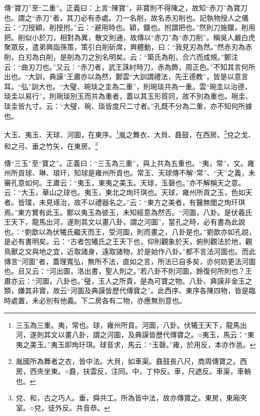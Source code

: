 {\noindent\zhuan{}\fzbyks 傳“寶刀”至“二重”。正義曰：上言“陳寶”，非寶則不得陳之，故知“赤刀”為寶刀也。謂之“赤刀”者，其刀必有赤處。刀一名削，故名赤刃削也。記執物授人之儀云：“刀授穎，削授拊。”云：“避用時也。穎，鐶也。拊謂把也。”然則刀施鐶，削用把。削似小於刀，相對為異，散文則通，故傳以“赤刀”為“赤刀削”。稱吳人嚴白虎聚眾反，遣弟興詣孫策，策引白削斫席，興體動，曰：“我見刃為然。”然赤刃為赤削，白刃為白削，是削為刀之別名明矣。云：“築氏為削，合六而成規。”鄭注云：“曲刃刀也。”又云：“赤刀者，武王誅紂時刀，赤為飾，周正色。”不知其言何所出也。“大訓，典謨”王肅亦以為然，鄭雲“大訓謂禮法，先王德教”，皆是以意言耳。“弘”訓大也。“大璧、琬琰之圭為二重”，則琬琰共為一重。雲“琬圭以治德，琰圭以易行”，則琬琰別玉而共為重者，蓋以其玉形質同，故不別為重也。琬圭、琰圭皆九寸。云：“大璧、琬、琰皆度尺二寸者。”孔既不分為二重，亦不知何所據也。 \par}

大玉、夷玉、天球、河圖，在東序。\footnote{三玉為三重。夷，常也。球，雍州所貢。河圖，八卦。伏犧王天下，龍馬出河，遂則其文以畫八卦，謂之河圖，及典謨皆歷代傳寶之。○夷玉，馬云：“東夷之美玉。”夷玉即珣玗琪。球音求，馬云：“玉磬。”雍，於用反，本亦作邕。}胤之舞衣、大貝、鼖鼓，在西房。\footnote{胤國所為舞者之衣，皆中法。大貝，如車渠。鼖鼓長八尺，商周傳寶之。西房，西夾坐東。○鼖，扶雲反，注同。中，丁仲反。車，尺遮反。車渠，車輈也。}兌之戈、和之弓、垂之竹矢，在東房。\footnote{兌、和，古之巧人。垂，舜共工。所為皆中法，故亦傳寶之。東房，東廂夾室。○兌，徒外反。共音恭。}


{\noindent\zhuan{}\fzbyks 傳“三玉”至“寶之”。正義曰：“三玉為三重”，與上共為五重也。“夷，常”，文。雍州所貢球、琳、琅玕，知球是雍州所貢也。常玉、天球傳不解“常”、“天”之義，未審孔意如何。王肅云：“夷玉，東夷之美玉。天球，玉磬也。”亦不解稱天之意。云：“大玉，華山之球也。夷玉，東北之珣玕琪也。天球，雍州所貢之玉，色如天者。皆璞，未見琢治，故不以禮器名之。”云：“東方之美者，有醫無閭之珣玕琪焉。”東方實有此玉。鄭以夷玉為彼玉，未知經意為然否。“河圖，八卦。是伏羲氏王天下，龍馬出河，遂則其文以畫八卦，謂之河圖”，當孔之時，必有書為此說也。：“劉歆以為伏犧氏繼天而王，受河圖，則而畫之，八卦是也。”劉歆亦如孔說，是必有書明矣。云：“古者包犧氏之王天下也，仰則觀象於天，俯則觀法於地，觀鳥獸之文與地之宜，近取諸身，遠取諸物，於是始作八卦。”都不言法河圖也。而此傳言“河圖”者，蓋理寬弘，無所不法，直如之言，所法已自多矣，亦何妨更法河圖也。且又云：“河出圖，洛出書，聖人則之。”若八卦不則河圖，餘復何所則也？王肅亦云：“河圖，八卦也。”璧，玉人之所貴，是為可寶之物。八卦、典謨非金玉之類，嫌其非寶，故云“河圖及典謨皆歷代傳寶之”。此西序、東序各陳四物，皆是臨時處置，未必別有他義。下二房各有二物，亦應無別意也。 \par}

